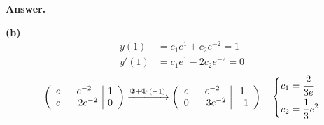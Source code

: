 \documentclass[12pt]{article}
\newenvironment{Answer}{%
  \par\medskip\noindent
  \begin{list}{}{%
    \setlength{\leftmargin}{0pt}%
    \setlength{\itemindent}{0pt}%
    \setlength{\listparindent}{0pt}%
  }%
  \item\relax
  \textbf{Answer.}\quad\ignorespaces
}{%
  \end{list}
  \par\medskip
}
\begin{document}
\begin{enumerate}[label=\textbf{\arabic*.}, leftmargin=*]
\begin{Answer}
  \vspace{0.5em}
  \textbf{(b)} \quad
  \begin{align*}
    y(1) &= c_1 e^1 + c_2 e^{-2} = 1 \\[0.3em]
    y'(1) &= c_1 e^1 - 2c_2 e^{-2} = 0
  \end{align*}
  \[
  \left( \begin{array}{cc|c}
    e & e^{-2} & 1 \\
    e & -2e^{-2} & 0
  \end{array} \right)
  \xrightarrow{\text{\ding{173}} + \text{\ding{172}} \cdot (-1)}
  \left( \begin{array}{cc|c}
    e & e^{-2} & 1 \\
    0 & -3e^{-2} & -1
  \end{array} \right)
  \quad \left\{ \begin{aligned}
    c_1 &= \frac{2}{3e} \\
    c_2 &= \frac{1}{3}e^2
  \end{aligned} \right.
  \]
  \end{Answer}
\end{enumerate}
\end{document}
